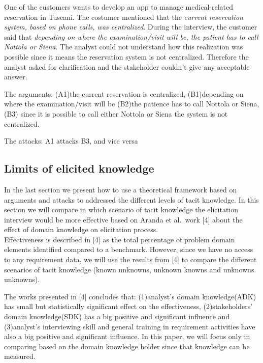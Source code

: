 \documentclass[]{llncs}
\begin{document}
One of the customers wants to develop an app to manage medical-related
reservation in Tuscani. The costumer mentioned that the \emph{current
reservation system, based on phone calls, was centralized}. During the
interview, the customer said that \emph{depending on where the
examination/visit will be, the patient has to call Nottola or Siena}.
The analyst could not understand how this realization was possible since
it means the reservation system is not centralized. Therefore the
analyst asked for clarification and the stakeholder couldn't give any
acceptable answer.

The arguments: (A1)the current reservation is centralized, (B1)depending
on where the examination/visit will be (B2)the patience has to call
Nottola or Siena, (B3) since it is possible to call either Nottola or
Siena the system is not centralized.

The attacks: A1 attacks B3, and vice versa

\hypertarget{limits-of-elicited-knowledge}{%
\subsection{Limits of elicited
knowledge}\label{limits-of-elicited-knowledge}}

In the last section we present how to use a theoretical framework based
on arguments and attacks to addressed the different levels of tacit
knowledge. In this section we will compare in which scenario of tacit
knowledge the elicitation interview would be more effective based on
Aranda et al.~work {[}4{]} about the effect of domain knowledge on
elicitation process.\\
Effectiveness is described in {[}4{]} as the total percentage of problem
domain elements identified compared to a benchmark. However, since we
have no access to any requirement data, we will use the results from
{[}4{]} to compare the different scenarios of tacit knowledge (known
unknowns, unknown knowns and unknowns unknowns).

The works presented in {[}4{]} concludes that: (1)analyst's domain
knowledge(ADK) has small but statistically significant effect on the
effectiveness, (2)stakeholders' domain knowledge(SDK) has a big positive
and significant influence and (3)analyst's interviewing skill and
general training in requirement activities have also a big positive and
significant influence. In this paper, we will focus only in comparing
based on the domain knowledge holder since that knowledge can be
measured.
\end{document}
